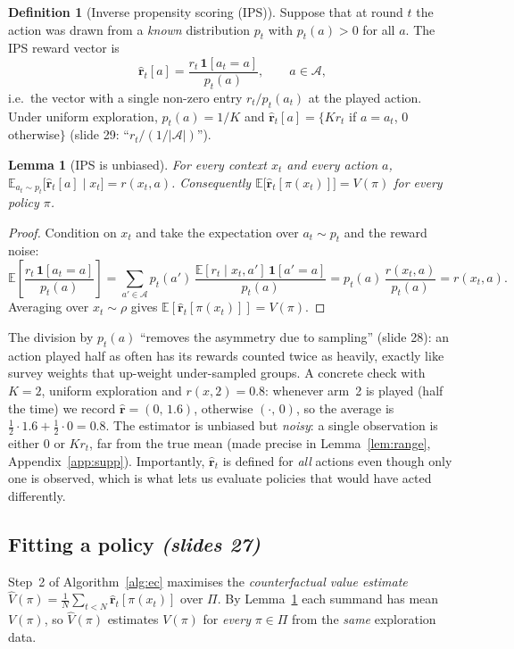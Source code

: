 \documentclass[11pt,a4paper]{article}
\newcommand{\E}{\mathbb{E}}
\newcommand{\ind}{\mathbf{1}}
\newcommand{\rh}{\hat{\mathbf{r}}}
\newcommand{\calA}{\mathcal{A}}
\newcommand{\slides}[1]{\emph{(slides #1)}}
\theoremstyle{plain}
\newtheorem{lemma}[theorem]{Lemma}
\theoremstyle{definition}
\newtheorem{definition}[theorem]{Definition}
\theoremstyle{remark}
\begin{document}
\begin{definition}[Inverse propensity scoring (IPS)]\label{def:ips}
Suppose that at round $t$ the action was drawn from a \emph{known} distribution $p_t$ with $p_t(a)>0$ for all $a$. The IPS reward vector is
\[
 \rh_t[a]=\frac{r_t\,\ind[a_t=a]}{p_t(a)},\qquad a\in\calA,
\]
i.e.\ the vector with a single non-zero entry $r_t/p_t(a_t)$ at the played action. Under uniform exploration, $p_t(a)=1/K$ and
$\rh_t[a]=\bigl\{K r_t$ if $a=a_t$, $0$ otherwise$\bigr\}$ (slide 29: ``$r_t/(1/|\calA|)$'').
\end{definition}

\begin{lemma}[IPS is unbiased]\label{lem:ips}
For every context $x_t$ and every action $a$, $\E_{a_t\sim p_t}\bigl[\rh_t[a]\mid x_t\bigr]=r(x_t,a)$. Consequently
$\E\bigl[\rh_t[\pi(x_t)]\bigr]=V(\pi)$ for every policy $\pi$.
\end{lemma}
\begin{proof}
Condition on $x_t$ and take the expectation over $a_t\sim p_t$ and the reward noise:
\[
 \E\!\left[\frac{r_t\,\ind[a_t=a]}{p_t(a)}\right]=\sum_{a'\in\calA}p_t(a')\,\frac{\E[r_t\mid x_t,a']\,\ind[a'=a]}{p_t(a)}
 =p_t(a)\,\frac{r(x_t,a)}{p_t(a)}=r(x_t,a).
\]
Averaging over $x_t\sim\rho$ gives $\E[\rh_t[\pi(x_t)]]=V(\pi)$.
\end{proof}

\begin{intuition}
The division by $p_t(a)$ ``removes the asymmetry due to sampling'' (slide 28): an action played half as often has its rewards counted twice as heavily,
exactly like survey weights that up-weight under-sampled groups. A concrete check with $K=2$, uniform exploration and $r(x,2)=0.8$: whenever arm~2 is played
(half the time) we record $\rh=(0,\,1.6)$, otherwise $(\cdot,\,0)$, so the average is $\tfrac12\cdot1.6+\tfrac12\cdot0=0.8$. The estimator is unbiased
but \emph{noisy}: a single observation is either $0$ or $Kr_t$, far from the true mean (made precise in Lemma~\ref{lem:range}, Appendix~\ref{app:supp}).
Importantly, $\rh_t$ is defined for \emph{all} actions even though only one is observed, which is what lets us evaluate policies that would have acted differently.
\end{intuition}

\subsection{Fitting a policy \slides{27}}

Step~2 of Algorithm~\ref{alg:ec} maximises the \emph{counterfactual value estimate}
$\hat V(\pi)=\frac1N\sum_{t<N}\rh_t[\pi(x_t)]$ over $\Pi$. By Lemma~\ref{lem:ips} each summand has mean $V(\pi)$, so $\hat V(\pi)$ estimates $V(\pi)$ for \emph{every} $\pi\in\Pi$ from the \emph{same} exploration data.
\end{document}
